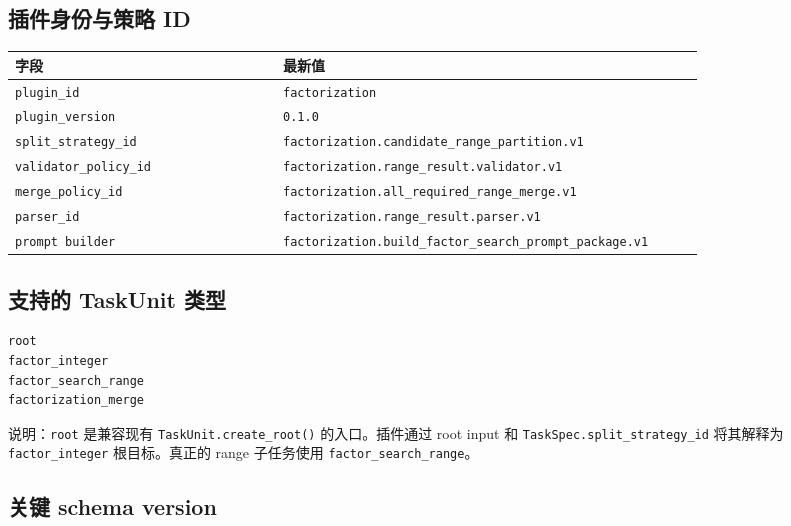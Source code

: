 \documentclass[11pt]{ctexart}
\begin{document}
\subsection{插件身份与策略 ID}

\begin{longtable}{p{0.35\linewidth}p{0.55\linewidth}}
\toprule
字段 & 最新值 \\
\midrule
\texttt{plugin\_id} & \texttt{factorization} \\
\texttt{plugin\_version} & \texttt{0.1.0} \\
\texttt{split\_strategy\_id} & \texttt{factorization.candidate\_range\_partition.v1} \\
\texttt{validator\_policy\_id} & \texttt{factorization.range\_result.validator.v1} \\
\texttt{merge\_policy\_id} & \texttt{factorization.all\_required\_range\_merge.v1} \\
\texttt{parser\_id} & \texttt{factorization.range\_result.parser.v1} \\
\texttt{prompt builder} & \texttt{factorization.build\_factor\_search\_prompt\_package.v1} \\
\bottomrule
\end{longtable}

\subsection{支持的 TaskUnit 类型}

\begin{lstlisting}
root
factor_integer
factor_search_range
factorization_merge
\end{lstlisting}

说明：\texttt{root} 是兼容现有 \texttt{TaskUnit.create\_root()} 的入口。插件通过 root input 和 \texttt{TaskSpec.split\_strategy\_id} 将其解释为 \texttt{factor\_integer} 根目标。真正的 range 子任务使用 \texttt{factor\_search\_range}。

\subsection{关键 schema version}
\end{document}
